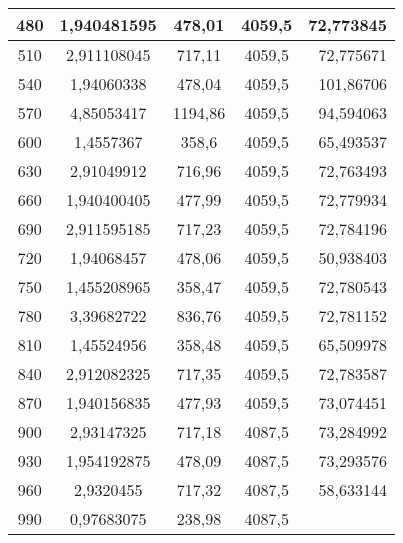 \begin{longtable}[c]{ccccc}
    \midrule
    480   & 1,940481595 & 478,01 & 4059,5 & \multicolumn{1}{r}{72,773845} \\
    \midrule
    510   & 2,911108045 & 717,11 & 4059,5 & \multicolumn{1}{r}{72,775671} \\
    \midrule
    540   & 1,94060338 & 478,04 & 4059,5 & \multicolumn{1}{r}{101,86706} \\
    \midrule
    570   & 4,85053417 & 1194,86 & 4059,5 & \multicolumn{1}{r}{94,594063} \\
    \midrule
    600   & 1,4557367 & 358,6 & 4059,5 & \multicolumn{1}{r}{65,493537} \\
    \midrule
    630   & 2,91049912 & 716,96 & 4059,5 & \multicolumn{1}{r}{72,763493} \\
    \midrule
    660   & 1,940400405 & 477,99 & 4059,5 & \multicolumn{1}{r}{72,779934} \\
    \midrule
    690   & 2,911595185 & 717,23 & 4059,5 & \multicolumn{1}{r}{72,784196} \\
    \midrule
    720   & 1,94068457 & 478,06 & 4059,5 & \multicolumn{1}{r}{50,938403} \\
    \midrule
    750   & 1,455208965 & 358,47 & 4059,5 & \multicolumn{1}{r}{72,780543} \\
    \midrule
    780   & 3,39682722 & 836,76 & 4059,5 & \multicolumn{1}{r}{72,781152} \\
    \midrule
    810   & 1,45524956 & 358,48 & 4059,5 & \multicolumn{1}{r}{65,509978} \\
    \midrule
    840   & 2,912082325 & 717,35 & 4059,5 & \multicolumn{1}{r}{72,783587} \\
    \midrule
    870   & 1,940156835 & 477,93 & 4059,5 & \multicolumn{1}{r}{73,074451} \\
    \midrule
    900   & 2,93147325 & 717,18 & 4087,5 & \multicolumn{1}{r}{73,284992} \\
    \midrule
    930   & 1,954192875 & 478,09 & 4087,5 & \multicolumn{1}{r}{73,293576} \\
    \midrule
    960   & 2,9320455 & 717,32 & 4087,5 & \multicolumn{1}{r}{58,633144} \\
    \midrule
    990   & 0,97683075 & 238,98 & 4087,5 &  \\
\end{longtable}


